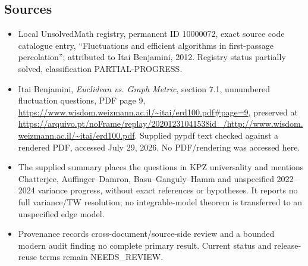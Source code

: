 \documentclass[11pt]{article}
\begin{document}
\subsection{Sources}
\begin{itemize}
\item Local UnsolvedMath registry, permanent ID 10000072, exact source code catalogue entry, ``Fluctuations and efficient algorithms in first-passage percolation''; attributed to Itai Benjamini, 2012. Registry status partially solved, classification PARTIAL-PROGRESS.
\item Itai Benjamini, \emph{Euclidean vs. Graph Metric}, section 7.1, unnumbered fluctuation questions, PDF page 9, \url{https://www.wisdom.weizmann.ac.il/~itai/erd100.pdf#page=9}, preserved at \url{https://arquivo.pt/noFrame/replay/20201231041538id_/http://www.wisdom.weizmann.ac.il/~itai/erd100.pdf}. Supplied pypdf text checked against a rendered PDF, accessed July 29, 2026. No PDF/rendering was accessed here.
\item The supplied summary places the questions in KPZ universality and mentions Chatterjee, Auffinger--Damron, Basu--Ganguly--Hamm and unspecified 2022--2024 variance progress, without exact references or hypotheses. It reports no full variance/TW resolution; no integrable-model theorem is transferred to an unspecified edge model.
\item Provenance records cross-document/source-side review and a bounded modern audit finding no complete primary result. Current status and release-reuse terms remain NEEDS\_REVIEW.
\end{itemize}
\end{document}
